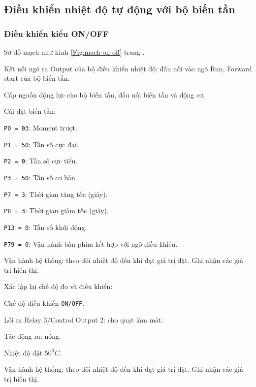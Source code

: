 \documentclass[13pt,a4paper]{extarticle}
\begin{document}
\subsection{Điều khiển nhiệt độ tự động với bộ biến tần}
\subsubsection{Điều khiển kiểu ON/OFF}
\begin{list}{--}{}
\item Sơ đồ mạch như hình \ref{Fig:mach-on-off} trang \pageref{Fig:mach-on-off}.
\item Kết nối ngõ ra Output của bộ điều khiển nhiệt độ: đầu nối vào ngõ Run, Forward start của bộ biến tần.
\item Cấp nguồn động lực cho bộ biến tần, đấu nối biến tần và động cơ.
\item Cài đặt biến tần:
\begin{list}{+}{}
\item \verb|P0 = 03|: Moment trượt.
\item \verb|P1 = 50|: Tần số cực đại.
\item \verb|P2 = 0|: Tần số cực tiểu.
\item \verb|P3 = 50|: Tần số cơ bản.
\item \verb|P7 = 3|: Thời gian tăng tốc (giây).
\item \verb|P8 = 3|: Thời gian giảm tốc (giây).
\item \verb|P13 = 0|: Tần số khởi động. 
\item \verb|P79 = 0|: Vận hành bàn phím kết hợp với ngõ điều khiển.
\end{list}
\item Vận hành hệ thống: theo dõi nhiệt độ đến khi đạt giá trị đặt. Ghi nhận các giá trị hiển thị.
\item Xác lập lại chế độ đo và điều khiển: 
\begin{list}{+}{}
\item Chế độ điều khiển \verb|ON/OFF|.
\item Lối ra Relay 3/Control Output 2: cho quạt làm mát.
\item Tác động ra: nóng.
\item Nhiệt độ đặt $50^0C$.
\end{list}
\item Vận hành hệ thống: theo dõi nhiệt độ đến khi đạt giá trị đặt. Ghi nhận các giá trị hiển thị.
\end{list}
\end{document}
